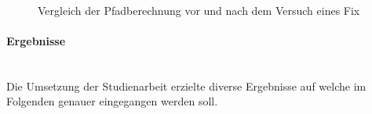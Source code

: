 \begin{figure}[H]
    \centering
    \\
    \caption{Vergleich der Pfadberechnung vor und nach dem Versuch eines Fix}
\end{figure}

\newpage
\paragraph{Ergebnisse} \mbox{}\\
Die Umsetzung der Studienarbeit erzielte diverse Ergebnisse auf welche im Folgenden genauer eingegangen werden soll.

